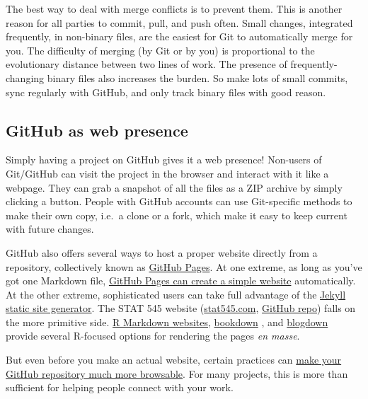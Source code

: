 \documentclass[12pt]{article}
\begin{document}
The best way to deal with merge conflicts is to prevent them. This is
another reason for all parties to commit, pull, and push often. Small
changes, integrated frequently, in non-binary files, are the easiest for
Git to automatically merge for you. The difficulty of merging (by Git or
by you) is proportional to the evolutionary distance between two lines
of work. The presence of frequently-changing binary files also increases
the burden. So make lots of small commits, sync regularly with GitHub,
and only track binary files with good reason.

\subsection{GitHub as web presence}\label{github-as-web-presence}

Simply having a project on GitHub gives it a web presence! Non-users of
Git/GitHub can visit the project in the browser and interact with it
like a webpage. They can grab a snapshot of all the files as a ZIP
archive by simply clicking a button. People with GitHub accounts can use
Git-specific methods to make their own copy, i.e.~a clone or a fork,
which make it easy to keep current with future changes.

GitHub also offers several ways to host a proper website directly from a
repository, collectively known as
\href{https://help.github.com/categories/github-pages-basics/}{GitHub
Pages}. At one extreme, as long as you've got one Markdown file,
\href{https://github.com/blog/2289-publishing-with-github-pages-now-as-easy-as-1-2-3}{GitHub
Pages can create a simple website} automatically. At the other extreme,
sophisticated users can take full advantage of the
\href{https://jekyllrb.com}{Jekyll static site generator}. The STAT 545
website (\href{http://stat545.com}{stat545.com},
\href{https://github.com/STAT545-UBC/STAT545-UBC.github.io}{GitHub
repo}) falls on the more primitive side.
\href{http://rmarkdown.rstudio.com/rmarkdown_websites.html}{R Markdown
websites}, \href{https://bookdown.org}{bookdown}
\citep{bookdown-pkg, bookdown-book}, and
\href{https://bookdown.org/yihui/blogdown/}{blogdown} provide several
R-focused options for rendering the pages \emph{en masse}.

But even before you make an actual website, certain practices can
\href{http://happygitwithr.com/repo-browsability.html}{make your GitHub
repository much more browsable}. For many projects, this is more than
sufficient for helping people connect with your work.
\end{document}
